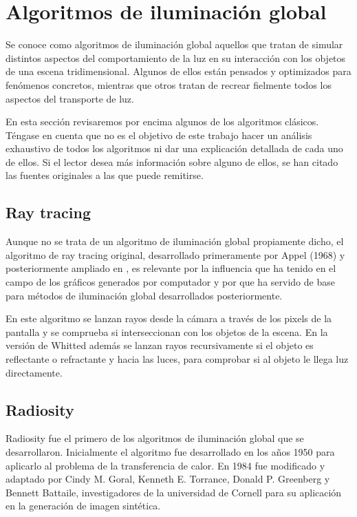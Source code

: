 \clearpage

\section{Algoritmos de iluminación global}

Se conoce como algoritmos de iluminación global aquellos que tratan de simular distintos aspectos del comportamiento de la luz en su interacción con los objetos de una escena tridimensional. Algunos de ellos están pensados y optimizados para fenómenos concretos, mientras que otros tratan de recrear fielmente todos los aspectos del transporte de luz.

\medskip
En esta sección revisaremos por encima algunos de los algoritmos clásicos. Téngase en cuenta que no es el objetivo de este trabajo hacer un análisis exhaustivo de todos los algoritmos ni dar una explicación detallada de cada uno de ellos. Si el lector desea más información sobre alguno de ellos, se han citado las fuentes originales a las que puede remitirse.

\subsection{Ray tracing}

Aunque no se trata de un algoritmo de iluminación global propiamente dicho, el algoritmo de ray tracing original, desarrollado primeramente por Appel (1968)\nocite{Appel1968} y posteriormente ampliado en \cite{Whitted1979}, es relevante por la influencia que ha tenido en el campo de los gráficos generados por computador y por que ha servido de base para métodos de iluminación global desarrollados posteriormente. 

\medskip

En este algoritmo se lanzan rayos desde la cámara a través de los pixels de la pantalla y se comprueba si interseccionan con los objetos de la escena. En la versión de Whitted además se lanzan rayos recursivamente si el objeto es reflectante o refractante y hacia las luces, para comprobar si al objeto le llega luz directamente.

 
\subsection{Radiosity}

Radiosity fue el primero de los algoritmos de iluminación global que se desarrollaron. Inicialmente el algoritmo fue desarrollado en los años 1950 para aplicarlo al problema de la transferencia de calor. En 1984 fue modificado y adaptado por \nocite{Goral1984} Cindy M. Goral, Kenneth E. Torrance, Donald P. Greenberg y Bennett Battaile, investigadores de la universidad de Cornell para su aplicación en la generación de imagen sintética.

